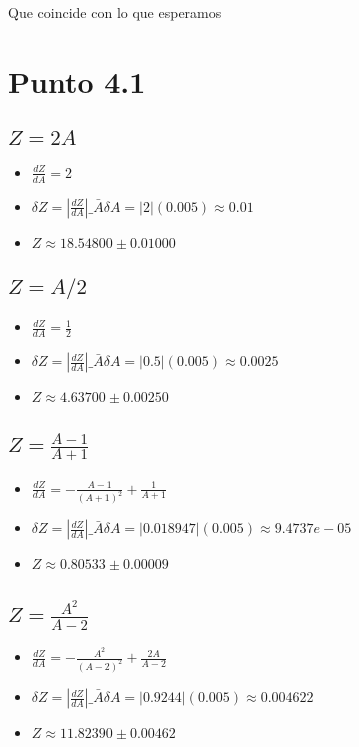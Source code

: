 \documentclass[12pt]{exam}
\begin{document}
Que coincide con lo que esperamos

\section{Punto 4.1}

\subsection{$Z = 2A$}
\begin{itemize}
\item $\frac{dZ}{dA} = 2$
\item $\delta Z = \left|\frac{dZ}{dA}\right|\_{\bar{A}} \delta A = |2|(0.005) \approx 0.01$
\item $Z \approx 18.54800 \pm 0.01000$
\end{itemize}
\vspace{0.5cm}

\subsection{$Z = A/2$}
\begin{itemize}
\item $\frac{dZ}{dA} = \frac{1}{2}$
\item $\delta Z = \left|\frac{dZ}{dA}\right|\_{\bar{A}} \delta A = |0.5|(0.005) \approx 0.0025$
\item $Z \approx 4.63700 \pm 0.00250$
\end{itemize}
\vspace{0.5cm}

\subsection{$Z = \frac{A-1}{A+1}$}
\begin{itemize}
\item $\frac{dZ}{dA} = - \frac{A - 1}{\left(A + 1\right)^{2}} + \frac{1}{A + 1}$
\item $\delta Z = \left|\frac{dZ}{dA}\right|\_{\bar{A}} \delta A = |0.018947|(0.005) \approx 9.4737e-05$
\item $Z \approx 0.80533 \pm 0.00009$
\end{itemize}
\vspace{0.5cm}

\subsection{$Z = \frac{A^2}{A-2}$}
\begin{itemize}
\item $\frac{dZ}{dA} = - \frac{A^{2}}{\left(A - 2\right)^{2}} + \frac{2 A}{A - 2}$
\item $\delta Z = \left|\frac{dZ}{dA}\right|\_{\bar{A}} \delta A = |0.9244|(0.005) \approx 0.004622$
\item $Z \approx 11.82390 \pm 0.00462$
\end{itemize}
\vspace{0.5cm}
\end{document}
